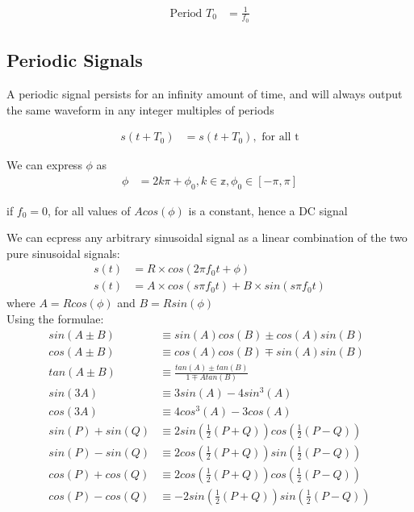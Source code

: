 \documentclass{article}
\begin{document}
    \begin{align}
        \text{Period } T_0 &= \frac{1}{f_0}
    \end{align}
    \subsection{Periodic Signals}
    A periodic signal persists for an infinity amount of time, and will always output the same waveform in any integer multiples of periods

    \begin{align}
        s(t + T_0) &= s(t + T_0), \text{ for all t}
    \end{align}
    
    We can express $\phi$ as
    \begin{align}
        \phi &= 2 k \pi + \phi_0, k \in \mathbb{{z}}, \phi_0 \in [-\pi, \pi]
    \end{align}

    if $f_0 = 0$, for all values of $A cos(\phi)$ is a constant, hence a DC signal
    
    We can ecpress any arbitrary sinusoidal signal as a linear combination of the two pure sinusoidal signals:
    \begin{align}
        s(t) &= R \times cos(2 \pi f_0 t + \phi)\\
        s(t) &= A \times cos(s \pi f_0 t) + B \times sin(s \pi f_0 t)
    \end{align}
    where $A = R cos(\phi)$ and $B = R sin(\phi)$\\
    Using the formulae:
    \begin{align}
        sin(A \pm B) &\equiv sin(A)cos(B) \pm cos(A)sin(B)\\
        cos(A \pm B) &\equiv cos(A)cos(B) \mp sin(A)sin(B)\\
        tan(A \pm B) &\equiv \frac{tan(A) \pm tan(B)}{1 \mp Atan(B)}\\
        sin(3A) &\equiv 3sin(A) - 4sin^3(A)\\
        cos(3A) &\equiv 4cos^3(A) - 3cos(A)\\
        sin(P) + sin(Q) &\equiv  2 sin (\frac{1}{2}(P + Q)) cos (\frac{1}{2}(P - Q))\\
        sin(P) - sin(Q) &\equiv  2 cos (\frac{1}{2}(P + Q)) sin (\frac{1}{2}(P - Q))\\
        cos(P) + cos(Q) &\equiv  2 cos (\frac{1}{2}(P + Q)) cos (\frac{1}{2}(P - Q))\\
        cos(P) - cos(Q) &\equiv -2 sin (\frac{1}{2}(P + Q)) sin (\frac{1}{2}(P - Q))\\
    \end{align}
\end{document}
